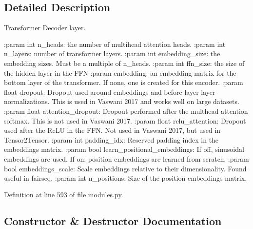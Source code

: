 \subsection{Detailed Description}
\begin{DoxyVerb}Transformer Decoder layer.

:param int n_heads: the number of multihead attention heads.
:param int n_layers: number of transformer layers.
:param int embedding_size: the embedding sizes. Must be a multiple of n_heads.
:param int ffn_size: the size of the hidden layer in the FFN
:param embedding: an embedding matrix for the bottom layer of the transformer.
    If none, one is created for this encoder.
:param float dropout: Dropout used around embeddings and before layer
    layer normalizations. This is used in Vaswani 2017 and works well on
    large datasets.
:param float attention_dropout: Dropout performed after the multhead attention
    softmax. This is not used in Vaswani 2017.
:param float relu_attention: Dropout used after the ReLU in the FFN. Not used
    in Vaswani 2017, but used in Tensor2Tensor.
:param int padding_idx: Reserved padding index in the embeddings matrix.
:param bool learn_positional_embeddings: If off, sinusoidal embeddings are
    used. If on, position embeddings are learned from scratch.
:param bool embeddings_scale: Scale embeddings relative to their dimensionality.
    Found useful in fairseq.
:param int n_positions: Size of the position embeddings matrix.
\end{DoxyVerb}
 

Definition at line 593 of file modules.\+py.



\subsection{Constructor \& Destructor Documentation}
\mbox{\label{classparlai_1_1agents_1_1transformer_1_1modules_1_1TransformerDecoder_ac9356241c0dd44bf980a155124cbde59}} 
